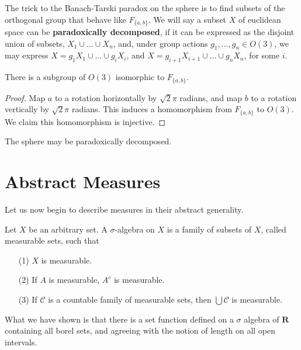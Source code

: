 The trick to the Banach-Tarski paradox on the sphere is to find subsets of the orthogonal group that behave like $F_{\{a,b\}}$. We will say a subset $X$ of euclidean space can be {\bf paradoxically decomposed}, if it can be expressed as the disjoint union of subsets, $X_1 \cup \dots \cup X_n$, and, under group actions $g_1, \dots, g_n \in O(3)$, we may express $X = g_1X_1 \cup \dots \cup g_iX_i$, and $X = g_{i+1}X_{i+1} \cup \dots \cup g_nX_n$, for some $i$.

\begin{lemma}
    There is a subgroup of $O(3)$ isomorphic to $F_{\{a,b\}}$.
\end{lemma}
\begin{proof}
    Map $a$ to a rotation horizontally by $\sqrt{2}\pi$ radians, and map $b$ to a rotation vertically by $\sqrt{2}\pi$ radians. This induces a homomorphism from $F_{\{a,b\}}$ to $O(3)$. We claim this homomorphism is injective.
\end{proof}

\begin{theorem}
    The sphere may be paradoxically decomposed.
\end{theorem}




\chapter{Abstract Measures}

Let us now begin to describe measures in their abstract generality.

\begin{definition}
    Let $X$ be an arbitrary set. A $\sigma$-algebra on $X$ is a family of subsets of $X$, called measurable sets, such that
    \begin{enumerate}
        \item[(1)] $X$ is measurable.
        \item[(2)] If $A$ is measurable, $A^c$ is measurable.
        \item[(3)] If $\mathcal{C}$ is a countable family of measurable sets, then $\bigcup \mathcal{C}$ is measurable.
    \end{enumerate}
\end{definition}

What we have shown is that there is a set function defined on a $\sigma$ algebra of $\mathbf{R}$ containing all borel sets, and agreeing with the notion of length on all open intervals.

